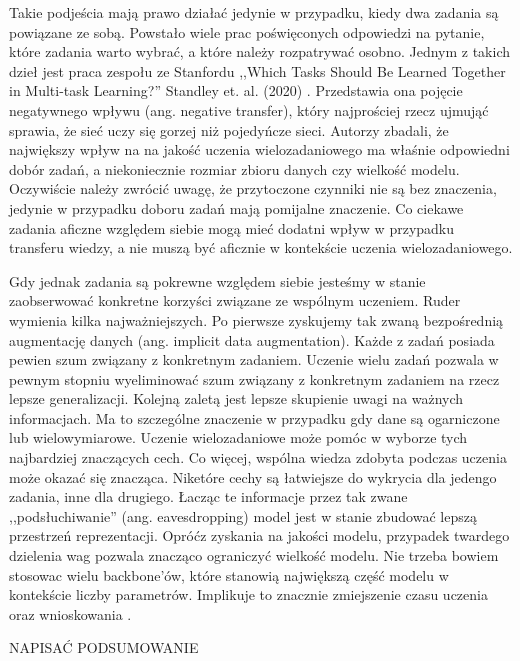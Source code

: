 Takie podjeścia mają prawo działać jedynie w przypadku, kiedy dwa zadania są powiązane ze sobą. Powstało wiele prac poświęconych odpowiedzi na pytanie, które zadania warto wybrać, a które należy rozpatrywać osobno. Jednym z takich dzieł jest praca zespołu ze Stanfordu ,,Which Tasks Should Be Learned Together in Multi-task Learning?'' Standley et. al. (2020) \cite{standley2020tasks}. Przedstawia ona pojęcie negatywnego wpływu (ang. negative transfer), który najprościej rzecz ujmująć sprawia, że sieć uczy się gorzej niż pojedyńcze sieci. Autorzy zbadali, że największy wpływ na na jakość uczenia wielozadaniowego ma właśnie odpowiedni dobór zadań, a niekoniecznie rozmiar zbioru danych czy wielkość modelu. Oczywiście należy zwrócić uwagę, że przytoczone czynniki nie są bez znaczenia, jedynie w przypadku doboru zadań mają pomijalne znaczenie. Co ciekawe zadania aficzne względem siebie mogą mieć dodatni wpływ w przypadku transferu wiedzy, a nie muszą być aficznie w kontekście uczenia wielozadaniowego.

Gdy jednak zadania są pokrewne względem siebie jesteśmy w stanie zaobserwować konkretne korzyści związane ze wspólnym uczeniem. Ruder wymienia kilka najważniejszych. Po pierwsze zyskujemy tak zwaną bezpośrednią augmentację danych (ang. implicit data augmentation). Każde z zadań posiada pewien szum związany z konkretnym zadaniem. Uczenie wielu zadań pozwala w pewnym stopniu wyeliminować szum związany z konkretnym zadaniem na rzecz lepsze generalizacji. Kolejną zaletą jest lepsze skupienie uwagi na ważnych informacjach. Ma to szczególne znaczenie w przypadku gdy dane są ogarniczone lub wielowymiarowe. Uczenie wielozadaniowe może pomóc w wyborze tych najbardziej znaczących cech. Co więcej, wspólna wiedza zdobyta podczas uczenia może okazać się znacząca. Niketóre cechy są łatwiejsze do wykrycia dla jedengo zadania, inne dla drugiego. Łacząc te informacje przez tak zwane ,,podsłuchiwanie'' (ang. eavesdropping) model jest w stanie zbudować lepszą przestrzeń reprezentacji. Opróćz zyskania na jakości modelu, przypadek twardego dzielenia wag pozwala znacząco ograniczyć wielkość modelu. Nie trzeba bowiem stosowac wielu backbone'ów, które stanowią największą część modelu w kontekście liczby parametrów. Implikuje to znacznie zmiejszenie czasu uczenia oraz wnioskowania \cite{standley2020tasks}.

NAPISAĆ PODSUMOWANIE
